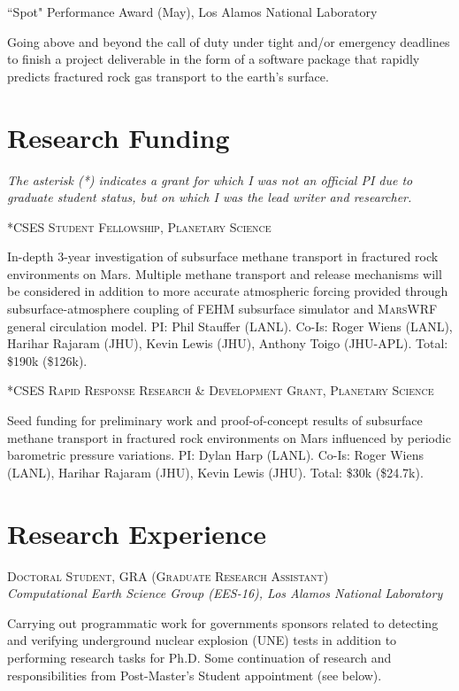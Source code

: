 \documentclass[11pt, letterpaper]{article}
\newcommand{\years}[1]{\marginnote{\scriptsize #1}}
\begin{document}
\years{2018}“Spot" Performance Award (May), Los Alamos National Laboratory
\begin{adjustwidth}{5pt}{0pt}
	Going above and beyond the call of duty under tight and/or emergency
	deadlines to finish a project deliverable in the form of a software package
	that rapidly predicts fractured rock gas transport to the earth’s surface.
\end{adjustwidth}

\section*{Research Funding}
\noindent
\emph{The asterisk (*) indicates a grant for which I was not an official PI due
to graduate student status, but on which I was the lead writer and researcher.}

\years{2021}\textsc{*CSES Student Fellowship, Planetary
Science}
\begin{adjustwidth}{5pt}{0pt}
	In-depth 3-year investigation of subsurface methane transport in fractured rock
	environments on Mars. Multiple methane transport and release mechanisms 
	will be considered in addition to more accurate atmospheric forcing
	provided through subsurface-atmosphere coupling of \textsc{FEHM} subsurface
	simulator and \textsc{MarsWRF} general circulation model. 
	PI: Phil Stauffer (LANL). Co-Is: Roger Wiens (LANL), Harihar Rajaram (JHU),
	Kevin Lewis (JHU), Anthony Toigo (JHU-APL). Total: \$190k (\$126k). 
\end{adjustwidth}

\years{2020}\textsc{*CSES Rapid Response Research \& Development Grant, Planetary
Science}
\begin{adjustwidth}{5pt}{0pt}
	Seed funding for preliminary work and proof-of-concept results of
	subsurface methane transport in fractured rock environments on Mars
	influenced by periodic barometric pressure variations.
	PI: Dylan Harp (LANL). Co-Is: Roger Wiens (LANL), Harihar Rajaram (JHU),
	Kevin Lewis (JHU). Total: \$30k (\$24.7k). %
\end{adjustwidth}


\section*{Research Experience}
\noindent
\years{2020 - Present}\textsc{Doctoral Student, GRA (Graduate Research Assistant)}\\
\textit{Computational Earth Science Group (EES-16), Los Alamos National Laboratory}
\begin{adjustwidth}{5pt}{0pt}
	Carrying out programmatic work for governments sponsors related to detecting
	and verifying underground nuclear explosion (UNE) tests in addition to
	performing research tasks for Ph.D. Some  continuation of research and
	responsibilities from Post-Master's Student appointment (see below). 
\end{adjustwidth}
\end{document}
